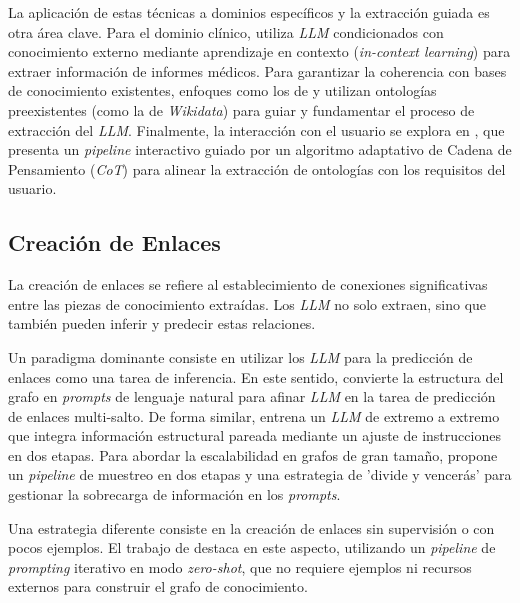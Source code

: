 La aplicación de estas técnicas a dominios específicos y la extracción guiada es otra área clave. Para el dominio clínico, \parencite{liAutomatedClinicalData2024} utiliza \textit{LLM} condicionados con conocimiento externo mediante aprendizaje en contexto (\textit{in-context learning}) para extraer información de informes médicos. Para garantizar la coherencia con bases de conocimiento existentes, enfoques como los de \parencite{fengOntologygroundedAutomaticKnowledge2024} y \parencite{mccuskerLOKELinkedOpen2023} utilizan ontologías preexistentes (como la de \textit{Wikidata}) para guiar y fundamentar el proceso de extracción del \textit{LLM}. Finalmente, la interacción con el usuario se explora en \parencite{abolhasaniLeveragingLLMAutomated2024}, que presenta un \textit{pipeline} interactivo guiado por un algoritmo adaptativo de Cadena de Pensamiento (\textit{CoT}) para alinear la extracción de ontologías con los requisitos del usuario.

\subsection{Creación de Enlaces}
La creación de enlaces se refiere al establecimiento de conexiones significativas entre las piezas de conocimiento extraídas. Los \textit{LLM} no solo extraen, sino que también pueden inferir y predecir estas relaciones.

Un paradigma dominante consiste en utilizar los \textit{LLM} para la predicción de enlaces como una tarea de inferencia. En este sentido, \parencite{shuKnowledgeGraphLarge2024} convierte la estructura del grafo en \textit{prompts} de lenguaje natural para afinar \textit{LLM} en la tarea de predicción de enlaces multi-salto. De forma similar, \parencite{heLinkGPTTeachingLarge2024} entrena un \textit{LLM} de extremo a extremo que integra información estructural pareada mediante un ajuste de instrucciones en dos etapas. Para abordar la escalabilidad en grafos de gran tamaño, \parencite{biLPNLScalableLink2024} propone un \textit{pipeline} de muestreo en dos etapas y una estrategia de 'divide y vencerás' para gestionar la sobrecarga de información en los \textit{prompts}.

Una estrategia diferente consiste en la creación de enlaces sin supervisión o con pocos ejemplos. El trabajo de \parencite{cartaIterativeZeroShotLLM2023} destaca en este aspecto, utilizando un \textit{pipeline} de \textit{prompting} iterativo en modo \textit{zero-shot}, que no requiere ejemplos ni recursos externos para construir el grafo de conocimiento.

